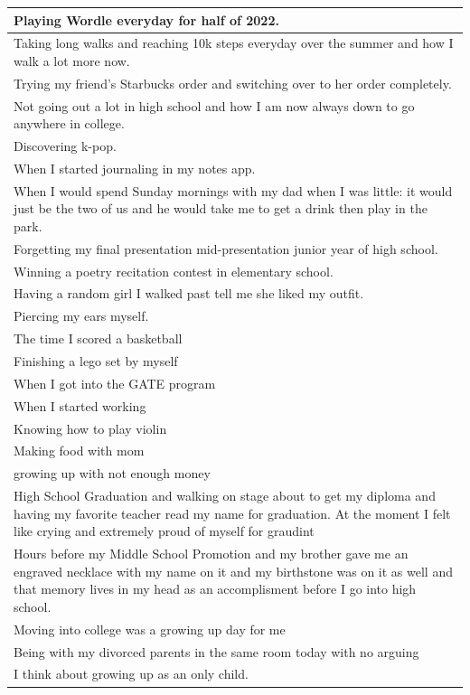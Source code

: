 \documentclass[
  .7em,
  letterpaper,
  DIV=11,
  numbers=noendperiod]{scrartcl}
\begin{document}
\begin{table}
\begin{tabular}{l}
\hline
Playing Wordle everyday for half of 2022.\\
\hline
Taking long walks and reaching 10k steps everyday over the summer and how I walk a lot more now.\\
\hline
Trying my friend's Starbucks order and switching over to her order completely.\\
\hline
Not going out a lot in high school and how I am now always down to go anywhere in college.\\
\hline
Discovering k-pop.\\
\hline
When I started journaling in my notes app.\\
\hline
When I would spend Sunday mornings with my dad when I was little: it would just be the two of us and he would take me to get a drink then play in the park.\\
\hline
Forgetting my final presentation mid-presentation junior year of high school.\\
\hline
Winning a poetry recitation contest in elementary school.\\
\hline
Having a random girl I walked past tell me she liked my outfit.\\
\hline
Piercing my ears myself.\\
\hline
The time I scored a basketball\\
\hline
Finishing a lego set by myself\\
\hline
When I got into the GATE program\\
\hline
When I started working\\
\hline
Knowing how to play violin\\
\hline
Making food with mom\\
\hline
growing up with not enough money\\
\hline
High School Graduation and walking on stage about to get my diploma and having my favorite teacher read my name for graduation. At the moment I felt like crying and extremely proud of myself for graudint\\
\hline
Hours before my Middle School Promotion and my brother gave me an engraved necklace with my name on it and my birthstone was on it as well and that memory lives in my head as an accomplisment before I go into high school.\\
\hline
Moving into college was a growing up day for me\\
\hline
Being with my divorced parents in the same room today with no arguing\\
\hline
I think about growing up as an only child.\\

\end{tabular}
\end{table}
\end{document}
